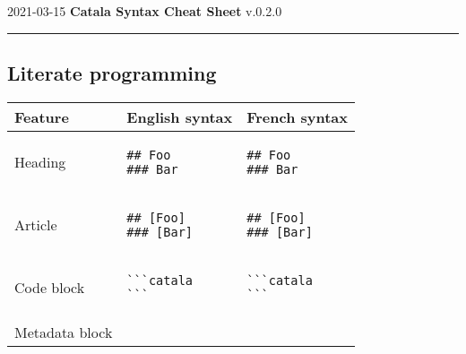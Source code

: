 \documentclass[a3paper,landscape]{article}
\begin{document}
\begin{center}
2021-03-15
\hfill
{\Huge\bfseries\sffamily
Catala Syntax Cheat Sheet}
\hfill
v.0.2.0
\end{center}
\hrule

\begin{multicols*}{2}





\section*{Literate programming}
\begin{center}
\begin{tabular}{p{}p{}p{}}
\toprule
Feature&English syntax&French syntax\\\midrule
Heading&
\vspace*{-1.75em}
\begin{verbatim}
## Foo
### Bar
\end{verbatim}
\vspace*{-1.75em}
&
\vspace*{-1.75em}
\begin{verbatim}
## Foo
### Bar
\end{verbatim}
\vspace*{-1.75em}
\\
Article&
\vspace*{-1.75em}
\begin{verbatim}
## [Foo]
### [Bar]
\end{verbatim}
\vspace*{-1.75em}
&
\vspace*{-1.75em}
\begin{verbatim}
## [Foo]
### [Bar]
\end{verbatim}
\vspace*{-1.75em}
\\
Code block&
\vspace*{-1.75em}
\begin{verbatim}
```catala
```
\end{verbatim}
\vspace*{-1.75em}
&
\vspace*{-1.75em}
\begin{verbatim}
```catala
```
\end{verbatim}
\vspace*{-1.75em}
\\
Metadata block&
\vspace*{-1.75em}

\end{tabular}
\end{center}
\end{multicols*}
\end{document}
